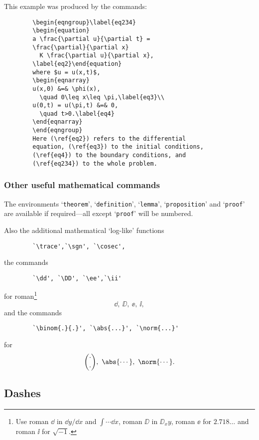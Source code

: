This example was produced by the commands:
\begin{verbatim}
        \begin{eqngroup}\label{eq234}
        \begin{equation}
        a \frac{\partial u}{\partial t} =
        \frac{\partial}{\partial x}
          K \frac{\partial u}{\partial x},
        \label{eq2}\end{equation}
        where $u = u(x,t)$,
        \begin{eqnarray}
        u(x,0) &=& \phi(x),
          \quad 0\leq x\leq \pi,\label{eq3}\\
        u(0,t) = u(\pi,t) &=& 0,
          \quad t>0.\label{eq4}
        \end{eqnarray}
        \end{eqngroup}
        Here (\ref{eq2}) refers to the differential
        equation, (\ref{eq3}) to the initial conditions,
        (\ref{eq4}) to the boundary conditions, and
        (\ref{eq234}) to the whole problem.
\end{verbatim}
 
\subsubsection{Other useful mathematical commands}
 
The environments `\verb!theorem!', `\verb!definition!', `\verb!lemma!',
`\verb!proposition!' and `\verb!proof!' are available if required---all
except `\verb!proof!' will be numbered.
 
Also the additional mathematical `log-like' functions
\begin{verbatim}
        `\trace',`\sgn', `\cosec',
\end{verbatim}
the commands
\begin{verbatim}
        `\dd', `\DD', `\ee',`\ii'
\end{verbatim}
for roman\footnote{Use roman $\dd$ in $\dd y/\dd x$ and $\int\cdots\dd x$,
roman $\DD$ in $\DD_xy$, roman $\ee$ for $2.718\ldots$ and roman $\ii$ for
$\sqrt{-1}$.}
$$\dd,\ \DD,\ \ee,\ \ii,$$
and the commands
\begin{verbatim}
        `\binom{.}{.}', `\abs{...}', `\norm{...}'
\end{verbatim}
for
$$\binom{\cdot}{\cdot},\ \abs{\cdots}, \ \norm{\cdots}.$$
 
\subsection{Dashes}
 
